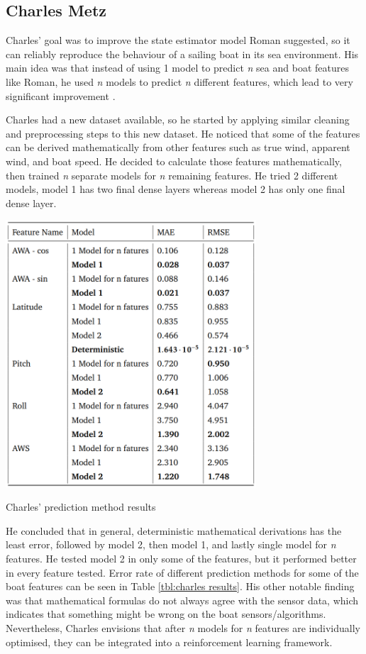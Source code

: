 \documentclass[12pt,twoside]{report}
\begin{document}
\subsection{Charles Metz}
Charles' goal was to improve the state estimator model Roman suggested, so it can reliably reproduce the behaviour of a sailing boat in its sea environment. His main idea was that instead of using 1 model to predict \emph{n} sea and boat features like Roman, he used \emph{n} models to predict \emph{n} different features, which lead to very significant improvement \cite{charles}.

Charles had a new dataset available, so he started by applying similar cleaning and preprocessing steps to this new dataset. He noticed that some of the features can be derived mathematically from other features such as true wind, apparent wind, and boat speed. He decided to calculate those features mathematically, then trained \emph{n} separate models for \emph{n} remaining features. He tried 2 different models, model 1 has two final dense layers whereas model 2 has only one final dense layer.

\begin{table}[h]
\centering
\includegraphics[width=0.7\textwidth]{figures/charles results.png}
\caption{Charles' prediction method results}
\label{tbl:charles results}
\end{table}

He concluded that in general, deterministic mathematical derivations has the least error, followed by model 2, then model 1, and lastly single model for \emph{n} features. He tested model 2 in only some of the features, but it performed better in every feature tested. Error rate of different prediction methods for some of the boat features can be seen in Table \ref{tbl:charles results}. His other notable finding was that mathematical formulas do not always agree with the sensor data, which indicates that something might be wrong on the boat sensors/algorithms. Nevertheless, Charles envisions that after \emph{n} models for \emph{n} features are individually optimised, they can be integrated into a reinforcement learning framework.
\end{document}
